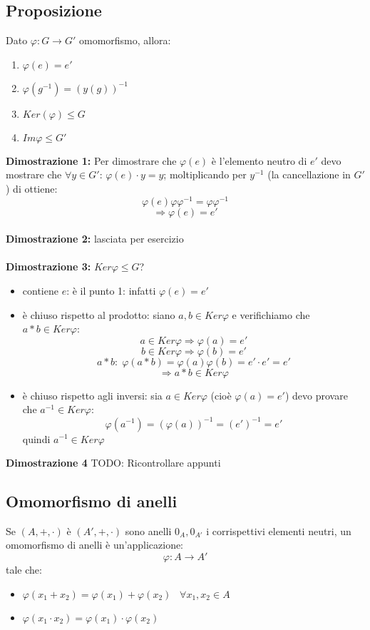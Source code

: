 \subsection{Proposizione}
Dato \(\varphi :G\rightarrow G'\) omomorfismo, allora:
\begin{enumerate}

	\item \(\varphi (e)=e'\)

	\item \(\varphi (g^{-1})=(y(g))^{-1}\)

	\item \(Ker(\varphi) \leq G\)

	\item \(Im\varphi\leq G'\)

\end{enumerate}

\textbf{Dimostrazione 1:} Per dimostrare che \(\varphi (e)\) è l'elemento neutro di \(e'\) devo mostrare che \(\forall y\in G'\): \(\varphi (e)\cdot y=y\); moltiplicando per \(y^{-1}\) (la cancellazione in \(G'\)) di ottiene:
\[\varphi (e)\varphi\varphi ^{-1}=\varphi\varphi ^{-1}\]
\[\Rightarrow \varphi (e)=e'\]
\\
\textbf{Dimostrazione 2:} lasciata per esercizio
\\\\
\textbf{Dimostrazione 3:} \(Ker\varphi\leq G\)?
\begin{itemize}

	\item contiene \(e\): è il punto 1: infatti \(\varphi (e)=e'\)

	\item è chiuso rispetto al prodotto: siano \(a,b\in Ker\varphi\) e verifichiamo che \(a*b\in Ker\varphi\):
	\[a\in Ker\varphi\Rightarrow\varphi(a)=e'\]
	\[b\in Ker\varphi\Rightarrow\varphi(b)=e'\]
	\[a*b:\;\varphi(a*b)=\varphi (a)\varphi(b)=e'\cdot e'=e'\]
	\[\Rightarrow a*b\in Ker\varphi\]

	\item è chiuso rispetto agli inversi: sia \(a\in Ker\varphi\) (cioè \(\varphi (a)=e'\)) devo provare che \(a^{-1}\in Ker\varphi\):
	\[\varphi (a^{-1})=(\varphi (a))^{-1} =(e')^{-1}=e'\]
	quindi \(a^{-1}\in Ker\varphi\)

\end{itemize}
\textbf{Dimostrazione 4}
TODO: Ricontrollare appunti

\subsection{Omomorfismo di anelli}
Se \((A,+,\cdot)\) è \((A',+,\cdot)\) sono anelli \(0_A, 0_{A'}\) i corrispettivi elementi neutri, un omomorfismo di anelli è un'applicazione:
\[\varphi: A\rightarrow A'\]
tale che:
\begin{itemize}

	\item \(\varphi (x_1+x_2)=\varphi (x_1)+\varphi (x_2)\;\;\;\forall x_1,x_2\in A\)

	\item \(\varphi (x_1\cdot x_2)=\varphi (x_1)\cdot \varphi (x_2)\)

\end{itemize}

